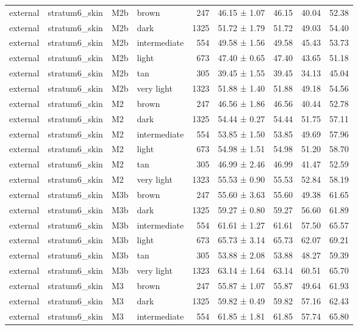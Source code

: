 \begin{tabular}{llllrlrrr}
external & stratum6\_skin & M2b & brown & 247 & 46.15 ± 1.07 & 46.15 & 40.04 & 52.38 \\
external & stratum6\_skin & M2b & dark & 1325 & 51.72 ± 1.79 & 51.72 & 49.03 & 54.40 \\
external & stratum6\_skin & M2b & intermediate & 554 & 49.58 ± 1.56 & 49.58 & 45.43 & 53.73 \\
external & stratum6\_skin & M2b & light & 673 & 47.40 ± 0.65 & 47.40 & 43.65 & 51.18 \\
external & stratum6\_skin & M2b & tan & 305 & 39.45 ± 1.55 & 39.45 & 34.13 & 45.04 \\
external & stratum6\_skin & M2b & very light & 1323 & 51.88 ± 1.40 & 51.88 & 49.18 & 54.56 \\
external & stratum6\_skin & M2 & brown & 247 & 46.56 ± 1.86 & 46.56 & 40.44 & 52.78 \\
external & stratum6\_skin & M2 & dark & 1325 & 54.44 ± 0.27 & 54.44 & 51.75 & 57.11 \\
external & stratum6\_skin & M2 & intermediate & 554 & 53.85 ± 1.50 & 53.85 & 49.69 & 57.96 \\
external & stratum6\_skin & M2 & light & 673 & 54.98 ± 1.51 & 54.98 & 51.20 & 58.70 \\
external & stratum6\_skin & M2 & tan & 305 & 46.99 ± 2.46 & 46.99 & 41.47 & 52.59 \\
external & stratum6\_skin & M2 & very light & 1323 & 55.53 ± 0.90 & 55.53 & 52.84 & 58.19 \\
external & stratum6\_skin & M3b & brown & 247 & 55.60 ± 3.63 & 55.60 & 49.38 & 61.65 \\
external & stratum6\_skin & M3b & dark & 1325 & 59.27 ± 0.80 & 59.27 & 56.60 & 61.89 \\
external & stratum6\_skin & M3b & intermediate & 554 & 61.61 ± 1.27 & 61.61 & 57.50 & 65.57 \\
external & stratum6\_skin & M3b & light & 673 & 65.73 ± 3.14 & 65.73 & 62.07 & 69.21 \\
external & stratum6\_skin & M3b & tan & 305 & 53.88 ± 2.08 & 53.88 & 48.27 & 59.39 \\
external & stratum6\_skin & M3b & very light & 1323 & 63.14 ± 1.64 & 63.14 & 60.51 & 65.70 \\
external & stratum6\_skin & M3 & brown & 247 & 55.87 ± 1.07 & 55.87 & 49.64 & 61.93 \\
external & stratum6\_skin & M3 & dark & 1325 & 59.82 ± 0.49 & 59.82 & 57.16 & 62.43 \\
external & stratum6\_skin & M3 & intermediate & 554 & 61.85 ± 1.81 & 61.85 & 57.74 & 65.80 \\

\end{tabular}
